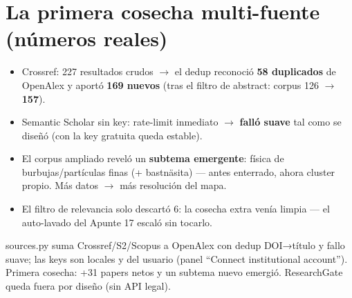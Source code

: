 \documentclass[11pt,a4paper]{article}
\begin{document}
\section{La primera cosecha multi-fuente (números reales)}

\begin{itemize}
  \item Crossref: 227 resultados crudos $\rightarrow$ el dedup reconoció \textbf{58
        duplicados} de OpenAlex y aportó \textbf{169 nuevos} (tras el filtro de abstract:
        corpus 126 $\rightarrow$ \textbf{157}).
  \item Semantic Scholar sin key: rate-limit inmediato $\rightarrow$ \textbf{falló suave} tal
        como se diseñó (con la key gratuita queda estable).
  \item El corpus ampliado reveló un \textbf{subtema emergente}: física de
        burbujas/partículas finas (+ bastnäsita) — antes enterrado, ahora cluster propio.
        Más datos $\rightarrow$ más resolución del mapa.
  \item El filtro de relevancia solo descartó 6: la cosecha extra venía limpia — el
        auto-lavado del Apunte 17 escaló sin tocarlo.
\end{itemize}

\begin{resumen}
sources.py suma Crossref/S2/Scopus a OpenAlex con dedup DOI→título y fallo suave; las keys
son locales y del usuario (panel ``Connect institutional account''). Primera cosecha: +31
papers netos y un subtema nuevo emergió. ResearchGate queda fuera por diseño (sin API legal).
\end{resumen}
\end{document}

